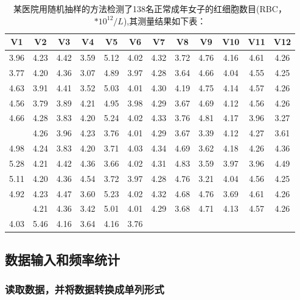 \documentclass[
]{article}
\begin{document}
\begin{table}

\caption{\label{tab:tab1}某医院用随机抽样的方法检测了138名正常成年女子的红细胞数目(RBC， $*10^{12}/L$),其测量结果如下表：}
\centering
\begin{tabular}[t]{cccccccccccc}
\toprule
V1 & V2 & V3 & V4 & V5 & V6 & V7 & V8 & V9 & V10 & V11 & V12\\
\midrule
3.96 & 4.23 & 4.42 & 3.59 & 5.12 & 4.02 & 4.32 & 3.72 & 4.76 & 4.16 & 4.61 & 4.26\\
3.77 & 4.20 & 4.36 & 3.07 & 4.89 & 3.97 & 4.28 & 3.64 & 4.66 & 4.04 & 4.55 & 4.25\\
4.63 & 3.91 & 4.41 & 3.52 & 5.03 & 4.01 & 4.30 & 4.19 & 4.75 & 4.14 & 4.57 & 4.26\\
4.56 & 3.79 & 3.89 & 4.21 & 4.95 & 3.98 & 4.29 & 3.67 & 4.69 & 4.12 & 4.56 & 4.26\\
4.66 & 4.28 & 3.83 & 4.20 & 5.24 & 4.02 & 4.33 & 3.76 & 4.81 & 4.17 & 3.96 & 3.27\\
\addlinespace
4.61 & 4.26 & 3.96 & 4.23 & 3.76 & 4.01 & 4.29 & 3.67 & 3.39 & 4.12 & 4.27 & 3.61\\
4.98 & 4.24 & 3.83 & 4.20 & 3.71 & 4.03 & 4.34 & 4.69 & 3.62 & 4.18 & 4.26 & 4.36\\
5.28 & 4.21 & 4.42 & 4.36 & 3.66 & 4.02 & 4.31 & 4.83 & 3.59 & 3.97 & 3.96 & 4.49\\
5.11 & 4.20 & 4.36 & 4.54 & 3.72 & 3.97 & 4.28 & 4.76 & 3.21 & 4.04 & 4.56 & 4.25\\
4.92 & 4.23 & 4.47 & 3.60 & 5.23 & 4.02 & 4.32 & 4.68 & 4.76 & 3.69 & 4.61 & 4.26\\
\addlinespace
3.89 & 4.21 & 4.36 & 3.42 & 5.01 & 4.01 & 4.29 & 3.68 & 4.71 & 4.13 & 4.57 & 4.26\\
4.03 & 5.46 & 4.16 & 3.64 & 4.16 & 3.76 &  &  &  &  &  & \\
\bottomrule
\end{tabular}
\end{table}

\hypertarget{ux6570ux636eux8f93ux5165ux548cux9891ux7387ux7edfux8ba1}{%
\subsection{数据输入和频率统计}\label{ux6570ux636eux8f93ux5165ux548cux9891ux7387ux7edfux8ba1}}

\hypertarget{ux8bfbux53d6ux6570ux636eux5e76ux5c06ux6570ux636eux8f6cux6362ux6210ux5355ux5217ux5f62ux5f0f}{%
\subsubsection{读取数据，并将数据转换成单列形式}\label{ux8bfbux53d6ux6570ux636eux5e76ux5c06ux6570ux636eux8f6cux6362ux6210ux5355ux5217ux5f62ux5f0f}}
\end{document}
